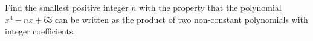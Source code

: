Find the smallest positive integer $n$ with the property that the polynomial $x^{4}-nx+63$ can be written as the product of two non-constant polynomials with integer coefficients. 